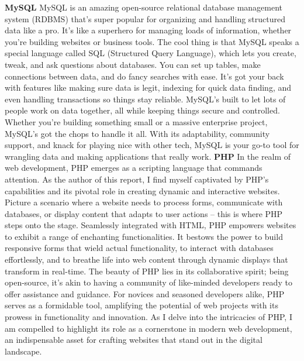 \textbf{MySQL}
\newline
MySQL is an amazing open-source relational database management system (RDBMS) that's super popular for organizing and handling structured data like a pro. It's like a superhero for managing loads of information, whether you're building websites or business tools. The cool thing is that MySQL speaks a special language called SQL (Structured Query Language), which lets you create, tweak, and ask questions about databases. You can set up tables, make connections between data, and do fancy searches with ease. It's got your back with features like making sure data is legit, indexing for quick data finding, and even handling transactions so things stay reliable. MySQL's built to let lots of people work on data together, all while keeping things secure and controlled. Whether you're building something small or a massive enterprise project, MySQL's got the chops to handle it all. With its adaptability, community support, and knack for playing nice with other tech, MySQL is your go-to tool for wrangling data and making applications that really work.
\newline
\newline
\textbf{PHP}
\newline
In the realm of web development, PHP emerges as a scripting language that commands attention. As the author of this report, I find myself captivated by PHP's capabilities and its pivotal role in creating dynamic and interactive websites. Picture a scenario where a website needs to process forms, communicate with databases, or display content that adapts to user actions – this is where PHP steps onto the stage. Seamlessly integrated with HTML, PHP empowers websites to exhibit a range of enchanting functionalities. It bestows the power to build responsive forms that wield actual functionality, to interact with databases effortlessly, and to breathe life into web content through dynamic displays that transform in real-time. The beauty of PHP lies in its collaborative spirit; being open-source, it's akin to having a community of like-minded developers ready to offer assistance and guidance. For novices and seasoned developers alike, PHP serves as a formidable tool, amplifying the potential of web projects with its prowess in functionality and innovation. As I delve into the intricacies of PHP, I am compelled to highlight its role as a cornerstone in modern web development, an indispensable asset for crafting websites that stand out in the digital landscape.
\newline

